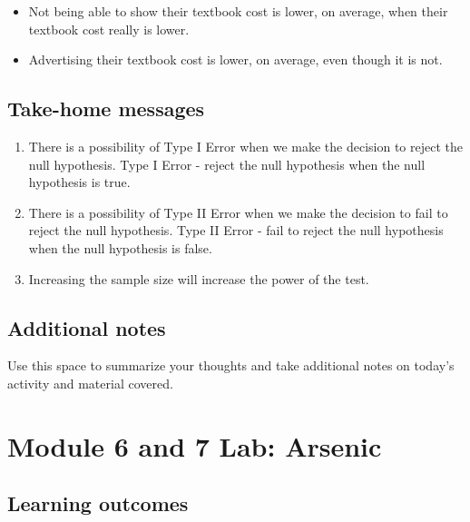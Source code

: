 \documentclass[
]{report}
\begin{document}
\begin{itemize}
\item
  Not being able to show their textbook cost is lower, on average, when their textbook cost really is lower.
\item
  Advertising their textbook cost is lower, on average, even though it is not.
\end{itemize}

\vspace{0.8in}

\subsection{Take-home messages}\label{take-home-messages-14}

\begin{enumerate}
\def\labelenumi{\arabic{enumi}.}
\item
  There is a possibility of Type I Error when we make the decision to reject the null hypothesis. Type I Error - reject the null hypothesis when the null hypothesis is true.
\item
  There is a possibility of Type II Error when we make the decision to fail to reject the null hypothesis. Type II Error - fail to reject the null hypothesis when the null hypothesis is false.
\item
  Increasing the sample size will increase the power of the test.
\end{enumerate}

\subsection{Additional notes}\label{additional-notes-14}

Use this space to summarize your thoughts and take additional notes on today's activity and material covered.

\newpage

\section{Module 6 and 7 Lab: Arsenic}\label{module-6-and-7-lab-arsenic}


\subsection{Learning outcomes}\label{learning-outcomes-16}
\end{document}
